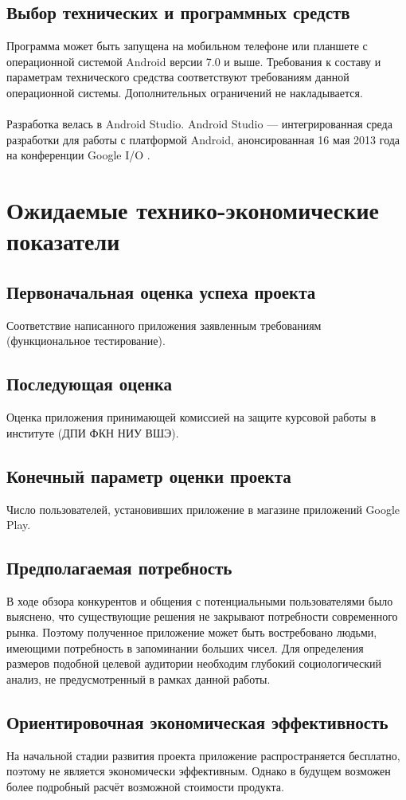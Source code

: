 \documentclass[draft]{article}
\begin{document}
\subsection{Выбор технических и программных средств}
Программа может быть запущена на мобильном телефоне или планшете с операционной системой Android версии 7.0 и выше. Требования к составу и параметрам технического средства соответствуют требованиям данной операционной системы. Дополнительных ограничений не накладывается.\\
~\\
Разработка велась в Android Studio. Android Studio — интегрированная среда разработки для работы с платформой Android, анонсированная 16 мая 2013 года на конференции Google I/O \cite{litlink4}.
\newpage
\section{Ожидаемые технико-экономические показатели}
\subsection{Первоначальная оценка успеха проекта}
Соответствие написанного приложения заявленным требованиям (функциональное тестирование).
\subsection{Последующая оценка}
Оценка приложения принимающей комиссией на защите курсовой работы в институте (ДПИ ФКН НИУ ВШЭ).
\subsection{Конечный параметр оценки проекта}
Число пользователей, установивших приложение в магазине приложений Google Play.\\
\subsection{Предполагаемая потребность}
В ходе обзора конкурентов и общения с потенциальными пользователями было выяснено, что существующие решения не закрывают потребности современного рынка. Поэтому полученное приложение может быть востребовано людьми, имеющими потребность в запоминании больших чисел. Для определения размеров подобной целевой аудитории необходим глубокий социологический анализ, не предусмотренный в рамках данной работы.
\subsection{Ориентировочная экономическая эффективность}
На начальной стадии развития проекта приложение распространяется бесплатно, поэтому не является экономически эффективным. Однако в будущем возможен более подробный расчёт возможной стоимости продукта.
\end{document}
